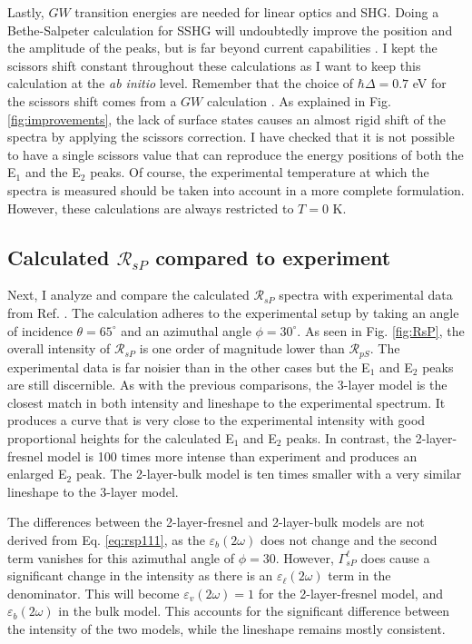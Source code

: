 Lastly, $GW$ transition energies are needed for linear optics and SHG. Doing a
Bethe-Salpeter calculation for SSHG will undoubtedly improve the position and
the amplitude of the peaks, but is far beyond current capabilities \cite{puff}.
I kept the scissors shift constant throughout these calculations as I want to
keep this calculation at the {\em ab initio} level. Remember that the choice of
$\hbar\Delta=0.7$ eV for the scissors shift comes from a $GW$ calculation
\cite{liPRB10}. As explained in Fig. \ref{fig:improvements}, the lack of surface
states causes an almost rigid shift of the spectra by applying the scissors
correction. I have checked that it is not possible to have a single scissors
value that can reproduce the energy positions of both the E$_{1}$ and the
E$_{2}$ peaks. Of course, the experimental temperature at which the spectra is
measured should be taken into account in a more complete formulation. However,
these calculations are always restricted to $T=0$ K.



\subsection{Calculated \texorpdfstring{$\mathcal{R}_{sP}$}{RsP} compared to 
experiment}\label{sec:1x1RsP}

Next, I analyze and compare the calculated $\mathcal{R}_{sP}$ spectra with
experimental data from Ref. \cite{mejiaPRB02}. The calculation adheres to the
experimental setup by taking an angle of incidence $\theta=65^{\circ}$ and an
azimuthal angle $\phi=30^\circ$. As seen in Fig. \ref{fig:RsP}, the overall
intensity of $\mathcal{R}_{sP}$ is one order of magnitude lower than
$\mathcal{R}_{pS}$. The experimental data is far noisier than in the other cases
but the E$_{1}$ and E$_{2}$ peaks are still discernible. As with the previous
comparisons, the 3-layer model is the closest match in both intensity and
lineshape to the experimental spectrum. It produces a curve that is very close
to the experimental intensity with good proportional heights for the calculated
E$_{1}$ and E$_{2}$ peaks. In contrast, the 2-layer-fresnel model is 100 times
more intense than experiment and produces an enlarged E$_{2}$ peak. The
2-layer-bulk model is ten times smaller with a very similar lineshape to the
3-layer model.

The differences between the 2-layer-fresnel and 2-layer-bulk models are not
derived from Eq. \eqref{eq:rsp111}, as the $\varepsilon_{b}(2\omega)$ does not
change and the second term vanishes for this azimuthal angle of $\phi = 30$.
However, $\Gamma^{\ell}_{sP}$ does cause a significant change in the intensity
as there is an $\varepsilon_{\ell}(2\omega)$ term in the denominator. This will
become $\varepsilon_{v}(2\omega) = 1$ for the 2-layer-fresnel model, and
$\varepsilon_{b}(2\omega)$ in the bulk model. This accounts for the significant
difference between the intensity of the two models, while the lineshape remains
mostly consistent.

